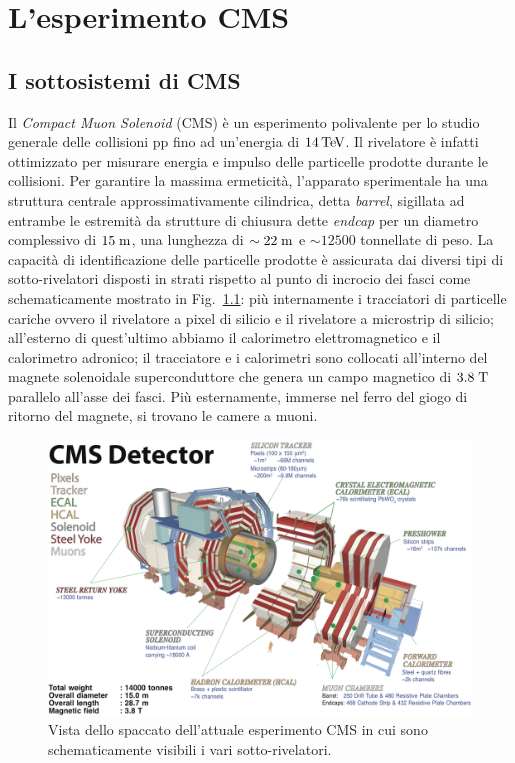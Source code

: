 \chapter{L'esperimento CMS}

\section{I sottosistemi di CMS}

Il {\em Compact Muon Solenoid} (CMS)\cite{Chatrchyan:2008aa} \`e un esperimento polivalente per lo studio generale delle collisioni pp fino ad un’energia di $14{\rm \, Te\kern-0.125em V}$. Il rivelatore \`e infatti ottimizzato per misurare energia e impulso delle particelle prodotte durante le collisioni. Per garantire la massima ermeticit\`a, l’apparato sperimentale ha una struttura centrale approssimativamente cilindrica, detta {\em barrel}, sigillata ad entrambe le estremit\`a da strutture di chiusura dette {\em endcap} per un diametro complessivo di $15\rm \; m$, una lunghezza di $\sim22\rm \; m$ e $\sim 12500$ tonnellate di peso. La capacit\`a di identificazione delle particelle prodotte \`e assicurata dai diversi tipi di sotto-rivelatori disposti in strati rispetto al punto di incrocio dei fasci come schematicamente mostrato in Fig.~\ref{fig:spaccatoCMS}: pi\`u internamente i tracciatori di particelle cariche ovvero il rivelatore a pixel di silicio e il rivelatore a microstrip di silicio; all'esterno di quest'ultimo abbiamo il calorimetro elettromagnetico e il calorimetro adronico; il tracciatore e i calorimetri sono collocati all’interno del magnete solenoidale superconduttore che genera un campo magnetico di $3.8\rm \; T$ parallelo all'asse dei fasci. Pi\`u esternamente, immerse nel ferro del giogo di ritorno del magnete, si trovano le camere a muoni.
\begin{figure}
\centering
\includegraphics[width=\textwidth]{Immagini/cms_3d.png}
\caption{Vista dello spaccato dell'attuale esperimento CMS in cui sono schematicamente visibili i vari sotto-rivelatori.}
\label{fig:spaccatoCMS}
\end{figure}

